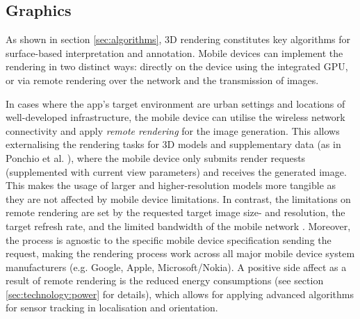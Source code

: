 \documentclass[review]{elsarticle}
\begin{document}
\subsection{Graphics}
\label{sec:technology:graphics}

As shown in section \ref{sec:algorithms}, 3D rendering constitutes key algorithms for surface-based interpretation and annotation. Mobile devices can implement the rendering in two distinct ways: directly on the device using the integrated \gls{GPU}, or via remote rendering over the network and the transmission of images.

In cases where the app's target environment are urban settings and locations of well-developed infrastructure, the mobile device can utilise the wireless network connectivity and apply \textit{remote rendering} for the image generation. This allows externalising the rendering tasks for 3D models and supplementary data (as in Ponchio et al. \cite{Ponchio2016}), where the mobile device only submits render requests (supplemented with current view parameters) and receives the generated image. This makes the usage of larger and higher-resolution models more tangible as they are not affected by mobile device limitations. In contrast, the limitations on remote rendering are set by the requested target image size- and resolution, the target refresh rate, and the limited bandwidth of the mobile network \cite{Ponchio2016,Evans2014}. Moreover, the process is agnostic to the specific mobile device specification sending the request, making the rendering process work across all major mobile device system manufacturers (e.g. Google, Apple, Microsoft/Nokia). A positive side affect as a result of remote rendering is the reduced energy consumptions (see section \ref{sec:technology:power} for details), which allows for applying advanced algorithms for sensor tracking in localisation and orientation.
\end{document}
